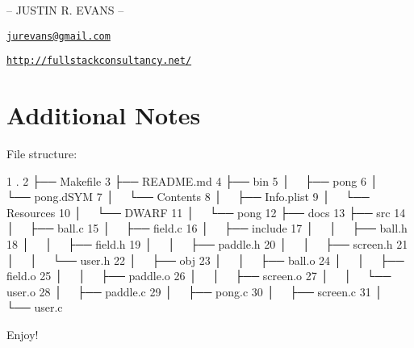 -- J\+U\+S\+T\+I\+N R. E\+V\+A\+N\+S --

\href{mailto:jurevans@gmail.com}{\tt jurevans@gmail.\+com}

\href{http://fullstackconsultancy.net/}{\tt http\+://fullstackconsultancy.\+net/}

\section*{Additional Notes }

File structure\+:


\begin{DoxyCode}
1 .
2 ├── Makefile
3 ├── README.md
4 ├── bin
5 │   ├── pong
6 │   └── pong.dSYM
7 │       └── Contents
8 │           ├── Info.plist
9 │           └── Resources
10 │               └── DWARF
11 │                   └── pong
12 ├── docs
13 ├── src
14 │   ├── ball.c
15 │   ├── field.c
16 │   ├── include
17 │   │   ├── ball.h
18 │   │   ├── field.h
19 │   │   ├── paddle.h
20 │   │   ├── screen.h
21 │   │   └── user.h
22 │   ├── obj
23 │   │   ├── ball.o
24 │   │   ├── field.o
25 │   │   ├── paddle.o
26 │   │   ├── screen.o
27 │   │   └── user.o
28 │   ├── paddle.c
29 │   ├── pong.c
30 │   ├── screen.c
31 │   └── user.c
\end{DoxyCode}


Enjoy! 